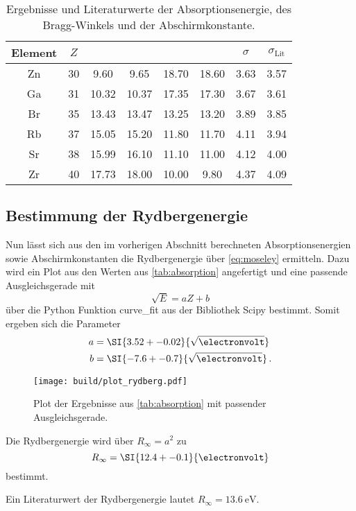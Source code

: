 \begin{table}
    \centering
    \caption{Ergebnisse und Literaturwerte der Absorptionsenergie, des Bragg-Winkels und der Abschirmkonstante.\cite{absorption}}
    \begin{tabular}{c S[table-format=1.0] S S S S S S}
        \toprule
        Element & $Z$ &  &  & \tableSI{\theta}{\degree} &  & $\sigma$ & $\sigma_\text{Lit}$ \\
        \midrule
        Zn & 30 & 9.60 & 9.65 & 18.70 & 18.60 & 3.63 & 3.57 \\
        Ga & 31 & 10.32 & 10.37 & 17.35 & 17.30 & 3.67 & 3.61 \\
        Br & 35 & 13.43 & 13.47 & 13.25 & 13.20 & 3.89 & 3.85 \\
        Rb & 37 & 15.05 & 15.20 & 11.80 & 11.70 & 4.11 & 3.94 \\
        Sr & 38 & 15.99 & 16.10 & 11.10 & 11.00 & 4.12 & 4.00 \\
        Zr & 40 & 17.73 & 18.00 & 10.00 & 9.80 & 4.37 & 4.09 \\
        \bottomrule
    \end{tabular}
    \label{tab:absorption}
\end{table}



\subsection{Bestimmung der Rydbergenergie}
\label{ssec:rydberg}

Nun lässt sich aus den im vorherigen Abschnitt berechneten Absorptionsenergien sowie Abschirmkonstanten die Rydbergenergie über \autoref{eq:moseley} ermitteln.
Dazu wird ein Plot aus den Werten aus \autoref{tab:absorption} angefertigt und eine passende Ausgleichsgerade mit
\begin{equation*}
    \sqrt{E} = aZ+b
\end{equation*}
über die Python Funktion curve\_fit aus der Bibliothek Scipy bestimmt.
Somit ergeben sich die Parameter
\begin{align*}
    a &= \SI{3.52+-0.02}{\sqrt{\electronvolt}} \\
    b &= \SI{-7.6+-0.7}{\sqrt{\electronvolt}} \,.
\end{align*}

\begin{figure}
    \centering
    \texttt{[image: build/plot\_rydberg.pdf]}
    \caption{Plot der Ergebnisse aus \autoref{tab:absorption} mit passender Ausgleichsgerade.}
    \label{fig:plot_rydberg}
\end{figure}

Die Rydbergenergie wird über $R_\infty=a^2$ zu 
\begin{equation*}
    R_\infty = \SI{12.4+-0.1}{\electronvolt}
\end{equation*}
bestimmt.

Ein Literaturwert der Rydbergenergie lautet $R_\infty=\SI{13.6}{\electronvolt}$.\cite{V602}